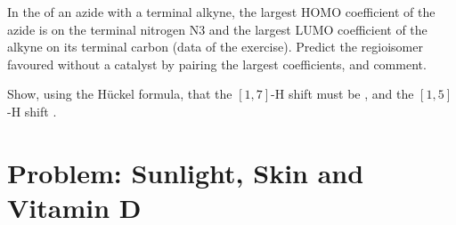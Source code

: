 \begin{exercise}[$\star\star\star$]\label{exo:b3:pericyclic:11}
In the  of an azide with a terminal alkyne, the largest
HOMO coefficient of the azide is on the terminal nitrogen N3 and the largest
LUMO coefficient of the alkyne on its terminal carbon (data of the exercise).
Predict the regioisomer favoured without a catalyst by pairing the largest
coefficients, and comment.
\end{exercise}

\begin{exercise}[$\star\star\star$]\label{exo:b3:pericyclic:12}
Show, using the Hückel formula, that the $[1,7]$-H shift must be ,
and the $[1,5]$-H shift .
\end{exercise}

\clearpage
\enlargethispage{3\baselineskip}
\section{Problem: Sunlight, Skin and Vitamin D}


